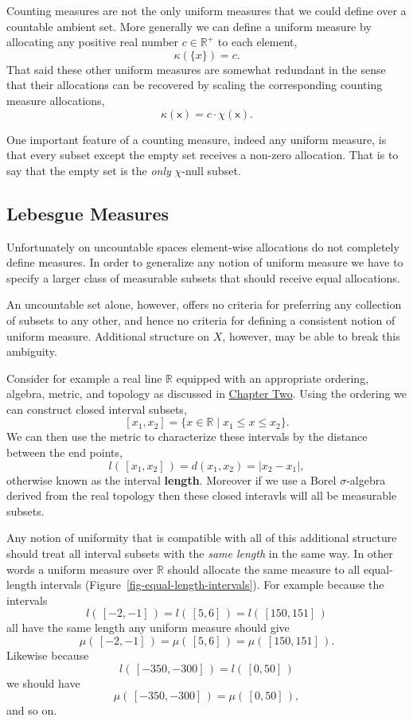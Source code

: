 \documentclass[
  letterpaper,
  DIV=11,
  numbers=noendperiod]{scrartcl}
\begin{document}
Counting measures are not the only uniform measures that we could define
over a countable ambient set. More generally we can define a uniform
measure by allocating any positive real number \(c \in \mathbb{R}^{+}\)
to each element, \[
\kappa(\{ x \}) = c.
\] That said these other uniform measures are somewhat redundant in the
sense that their allocations can be recovered by scaling the
corresponding counting measure allocations, \[
\kappa ( \mathsf{x} ) = c \cdot \chi ( \mathsf{x} ).
\]

One important feature of a counting measure, indeed any uniform measure,
is that every subset except the empty set receives a non-zero
allocation. That is to say that the empty set is the \emph{only}
\(\chi\)-null subset.

\hypertarget{sec:lebesgue}{%
\subsection{Lebesgue Measures}\label{sec:lebesgue}}

Unfortunately on uncountable spaces element-wise allocations do not
completely define measures. In order to generalize any notion of uniform
measure we have to specify a larger class of measurable subsets that
should receive equal allocations.

An uncountable set alone, however, offers no criteria for preferring any
collection of subsets to any other, and hence no criteria for defining a
consistent notion of uniform measure. Additional structure on \(X\),
however, may be able to break this ambiguity.

Consider for example a real line \(\mathbb{R}\) equipped with an
appropriate ordering, algebra, metric, and topology as discussed in
\href{https://betanalpha.github.io/assets/chapters_html/spaces.html}{Chapter
Two}. Using the ordering we can construct closed interval subsets, \[
[ x_{1}, x_{2} ] = \{ x \in \mathbb{R} \mid x_{1} \le x \le x_{2} \}.
\] We can then use the metric to characterize these intervals by the
distance between the end points, \[
l( \, [ x_{1}, x_{2} ] \, ) = d( x_{1}, x_{2} ) = | x_{2} - x_{1} |,
\] otherwise known as the interval \textbf{length}. Moreover if we use a
Borel \(\sigma\)-algebra derived from the real topology then these
closed interavls will all be measurable subsets.

Any notion of uniformity that is compatible with all of this additional
structure should treat all interval subsets with the \emph{same length}
in the same way. In other words a uniform measure over \(\mathbb{R}\)
should allocate the same measure to all equal-length intervals
(Figure~\ref{fig-equal-length-intervals}). For example because the
intervals \[
l( \, [-2, -1] \, ) = l( \, [5, 6] \, ) = l( \, [150, 151] \,)
\] all have the same length any uniform measure should give \[
\mu( \, [-2, -1] \, ) = \mu( \, [5, 6] \, ) = \mu( \, [150, 151] \, ).
\] Likewise because \[
l( \, [-350, -300] \, ) = l( \, [0, 50] \, )
\] we should have \[
\mu( \, [-350, -300] \, ) = \mu( \, [0, 50] \,),
\] and so on.
\end{document}
